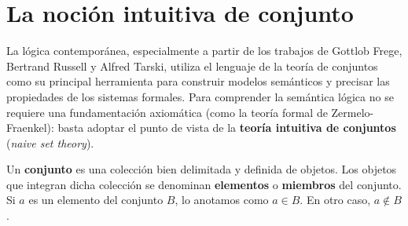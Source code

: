 \section{La noción intuitiva de conjunto}

La lógica contemporánea, especialmente a partir de los trabajos de
Gottlob Frege, Bertrand Russell y Alfred Tarski, utiliza el lenguaje
de la teoría de conjuntos como su principal herramienta para construir
modelos semánticos y precisar las propiedades de los sistemas
formales. Para comprender la
semántica lógica no se requiere
una fundamentación axiomática 
(como la teoría formal de Zermelo-Fraenkel): basta adoptar el punto de vista de la \textbf{teoría
  intuitiva de conjuntos} (\emph{naive set theory}). 

\begin{definicion}
Un \textbf{conjunto} es una colección bien delimitada y definida de
objetos. Los objetos que integran dicha colección se denominan
\textbf{elementos} o \textbf{miembros} del conjunto. Si $a$ es un
elemento del conjunto $B$, lo anotamos como $a\in B$. En otro caso,
$a\notin B$. 
\end{definicion}

